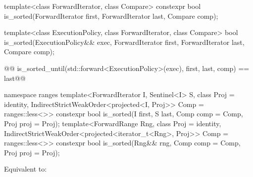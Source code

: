 %
\begin{itemdecl}
template<class ForwardIterator, class Compare>
  constexpr bool is_sorted(ForwardIterator first, ForwardIterator last,
                           Compare comp);
\end{itemdecl}

\begin{itemdescr}
\pnum
\removed{\returns} 
\end{itemdescr}


%
\begin{itemdecl}
template<class ExecutionPolicy, class ForwardIterator, class Compare>
  bool is_sorted(ExecutionPolicy&& exec,
                 ForwardIterator first, ForwardIterator last,
                 Compare comp);
\end{itemdecl}

\begin{itemdescr}
\pnum
\removed{\returns}
\begin{codeblock}
@@ is_sorted_until(std::forward<ExecutionPolicy>(exec), first, last, comp) == last@\added{;}@
\end{codeblock}
\end{itemdescr}

\begin{addedblock}
%
\begin{itemdecl}
namespace ranges {
  template<ForwardIterator I, Sentinel<I> S, class Proj = identity,
      IndirectStrictWeakOrder<projected<I, Proj>> Comp = ranges::less<>>
    constexpr bool is_sorted(I first, S last, Comp comp = Comp{}, Proj proj = Proj{});
  template<ForwardRange Rng, class Proj = identity,
      IndirectStrictWeakOrder<projected<iterator_t<Rng>, Proj>> Comp = ranges::less<>>
    constexpr bool is_sorted(Rng&& rng, Comp comp = Comp{}, Proj proj = Proj{});
}
\end{itemdecl}

\begin{itemdescr}
\pnum
\effects Equivalent to: 
\end{itemdescr}
\end{addedblock}

